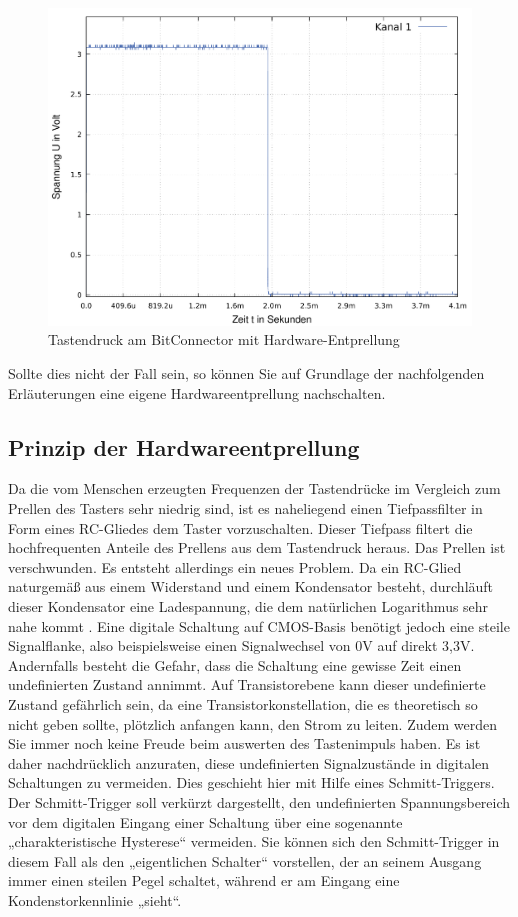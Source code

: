 \documentclass{article}
\begin{document}
{\begin{figure}[!h]
	\centering
	\includegraphics[width=0.92\linewidth]{Figures/debounce}
	\caption{Tastendruck am BitConnector mit Hardware-Entprellung}
	\label{fig:prellen_3}
\end{figure}

Sollte dies nicht der Fall sein, so können Sie auf Grundlage der nachfolgenden Erläuterungen eine eigene Hardwareentprellung nachschalten.

\subsection{Prinzip der Hardwareentprellung}
Da die vom Menschen erzeugten Frequenzen der Tastendrücke im Vergleich zum Prellen des Tasters sehr niedrig sind, ist es naheliegend einen Tiefpassfilter in Form eines RC-Gliedes dem Taster vorzuschalten. 
Dieser Tiefpass filtert die hochfrequenten Anteile des Prellens aus dem Tastendruck heraus. Das Prellen ist verschwunden. Es entsteht allerdings ein neues Problem. Da ein RC-Glied naturgemäß aus einem Widerstand und einem Kondensator besteht, durchläuft dieser Kondensator eine Ladespannung, die dem natürlichen Logarithmus sehr nahe kommt \autocite{RC}. Eine digitale Schaltung auf CMOS-Basis benötigt jedoch eine steile Signalflanke, also beispielsweise einen Signalwechsel von 0V auf direkt 3,3V. Andernfalls besteht die Gefahr, dass die Schaltung eine gewisse Zeit einen undefinierten Zustand annimmt. Auf Transistorebene kann dieser undefinierte Zustand gefährlich sein, da eine Transistorkonstellation, die es theoretisch so nicht geben sollte, plötzlich anfangen kann, den Strom zu leiten. Zudem werden Sie immer noch keine Freude beim auswerten des Tastenimpuls haben. Es ist daher nachdrücklich anzuraten, diese undefinierten Signalzustände in digitalen Schaltungen zu vermeiden. Dies geschieht hier mit Hilfe eines Schmitt-Triggers. Der Schmitt-Trigger soll verkürzt dargestellt, den undefinierten Spannungsbereich vor dem digitalen Eingang einer Schaltung über eine sogenannte „charakteristische Hysterese“ vermeiden. Sie können sich den Schmitt-Trigger in diesem Fall als den „eigentlichen Schalter“ vorstellen, der an seinem Ausgang immer einen steilen Pegel schaltet, während er am Eingang eine Kondenstorkennlinie „sieht“.


}
\end{document}
